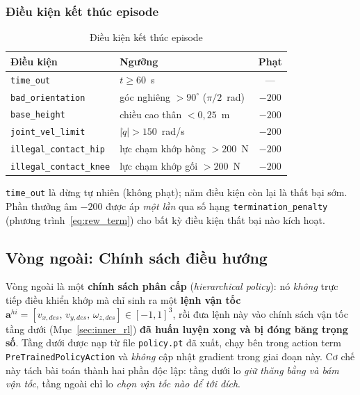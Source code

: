 \subsubsection{Điều kiện kết thúc episode}

\begin{table}[H]
    \centering
    \caption{Điều kiện kết thúc episode}
    \label{tab:terminations}
    \renewcommand{\arraystretch}{1.3}
    \begin{tabular}{|l|l|c|}
    \hline
    \textbf{Điều kiện} & \textbf{Ngưỡng} & \textbf{Phạt} \\
    \hline
    \texttt{time\_out}              & $t \geq 60$~s                         & — \\
    \texttt{bad\_orientation}       & góc nghiêng $> 90^\circ$ ($\pi/2$~rad) & $-200$ \\
    \texttt{base\_height}           & chiều cao thân $< 0{,}25$~m           & $-200$ \\
    \texttt{joint\_vel\_limit}      & $|\dot{q}| > 150$~rad/s               & $-200$ \\
    \texttt{illegal\_contact\_hip}  & lực chạm khớp hông $> 200$~N          & $-200$ \\
    \texttt{illegal\_contact\_knee} & lực chạm khớp gối $> 200$~N           & $-200$ \\
    \hline
    \end{tabular}
\end{table}

\texttt{time\_out} là dừng tự nhiên (không phạt); năm điều kiện còn lại là
thất bại sớm. Phần thưởng âm $-200$ được áp \emph{một lần} qua số hạng
\texttt{termination\_penalty} (phương trình~\eqref{eq:rew_term}) cho bất kỳ
điều kiện thất bại nào kích hoạt.


\subsection{Vòng ngoài: Chính sách điều hướng}
\label{sec:outer_rl}

Vòng ngoài là một \textbf{chính sách phân cấp} (\textit{hierarchical
policy}): nó \emph{không} trực tiếp điều khiển khớp mà chỉ sinh ra một
\textbf{lệnh vận tốc}
$\mathbf{a}^{hi}=[v_{x,des},\,v_{y,des},\,\omega_{z,des}]\in[-1,1]^3$,
rồi đưa lệnh này vào chính sách vận tốc tầng dưới
(Mục~\ref{sec:inner_rl}) \textbf{đã huấn luyện xong và bị đóng băng trọng
số}. Tầng dưới được nạp từ file \texttt{policy.pt} đã xuất, chạy bên trong
action term \texttt{PreTrainedPolicyAction} và \emph{không} cập nhật gradient
trong giai đoạn này. Cơ chế này tách bài toán thành hai phần độc lập: tầng
dưới lo \textit{giữ thăng bằng và bám vận tốc}, tầng ngoài chỉ lo
\textit{chọn vận tốc nào để tới đích}.

